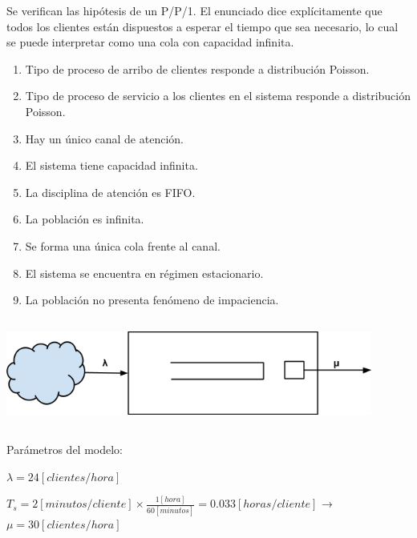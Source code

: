 \documentclass[a4paper,11pt]{article}
\begin{document}
Se verifican las hipótesis de un P/P/1. El enunciado dice explícitamente que
todos los clientes están dispuestos a esperar el tiempo que sea necesario, lo
cual se puede interpretar como una cola con capacidad infinita.

\begin{enumerate}[1.]
  \item Tipo de proceso de arribo de clientes responde a distribución Poisson.
  \item Tipo de proceso de servicio a los clientes en el sistema responde a
    distribución Poisson.
  \item Hay un único canal de atención.
  \item El sistema tiene capacidad infinita.
  \item La disciplina de atención es FIFO.
  \item La población es infinita.
  \item Se forma una única cola frente al canal.
  \item El sistema se encuentra en régimen estacionario.
  \item La población no presenta fenómeno de impaciencia.
\end{enumerate}

\vspace{13pt}
\includegraphics[width=341pt, height=101pt, keepaspectratio=true]{TP1-Colas-fig001.png}

\vspace{27pt}
Parámetros del modelo:

$\lambda = 24 [clientes/hora]$

$T_s = 2 [minutos/cliente] \times \frac{1[hora]}{60[minutos]} = 0.033
[horas/cliente]$ → $\mu = 30 [clientes/hora]$
\end{document}
